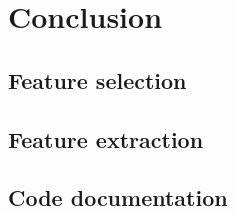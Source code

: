 \documentclass[
  oneside,
  11pt, a4paper,
  footinclude=true,
  headinclude=true,
  cleardoublepage=empty
]{scrbook}
\begin{document}
\part{Conclusion}


%
		
\cleardoublepage



\printglossary
\printglossary[type=\acronymtype]

\appendix
\renewcommand\chaptername{Appendix}

\chapter{Feature selection}
\label{apdx:sec:feature_selection}


\chapter{Feature extraction}
\label{apdx:sec:feature_extraction}


\chapter{Code documentation}
\label{apdx:sec:code_documentation}


\begin{backcover}
\thispagestyle{empty} \pagecolor{white} \textcolor{black} {\selectfont ~\vfill
\noindent
%
\vfill ~}
\end{backcover}
\end{document}
